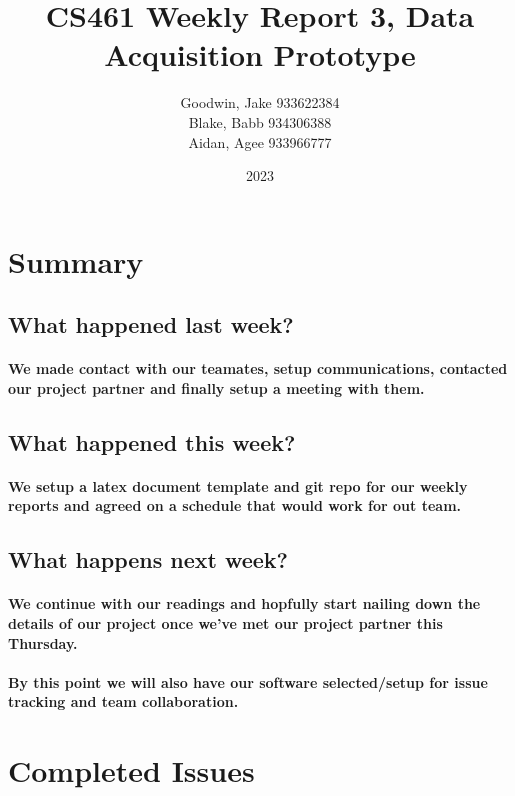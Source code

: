 \documentclass{article}
\title{CS461 Weekly Report 3, Data Acquisition Prototype}
\author{
    {Goodwin, Jake
    933622384}\\
    {Blake, Babb
    934306388}\\
    {Aidan, Agee
    933966777}
}
\date{2023}
\begin{document}
\maketitle

\section{Summary}


\subsection{What happened last week?}
\paragraph{
We made contact with our teamates, setup communications, contacted our project
partner and finally setup a meeting with them.
}

\subsection{What happened this week?}
\paragraph{
We setup a latex document template and git repo for our weekly reports
and agreed on a schedule that would work for out team.
}


\subsection{What happens next week?}
\paragraph{
We continue with our readings and hopfully start nailing down the details
of our project once we've met our project partner this Thursday.
}

\paragraph{
    By this point we will also have our software selected/setup for issue tracking
    and team collaboration.
}

\section{Completed Issues}
\end{document}

